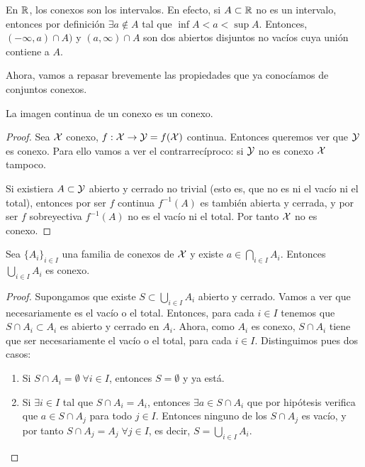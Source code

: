 \begin{exa}
	En $\mathbb{R}$, los conexos son los intervalos. En efecto, si $A\subset\mathbb{R}$ no es un intervalo, entonces por definición $\exists a\notin A$ tal que $\inf A< a < \sup A$. Entonces, $(-\infty, a)\cap A)$ y $(a,\infty)\cap A$ son dos abiertos disjuntos no vacíos cuya unión contiene a $A$.
\end{exa}

Ahora, vamos a repasar brevemente las propiedades que ya conocíamos de conjuntos conexos.

\begin{prop}
	\label{conex_prop_im_continua}
	La imagen continua de un conexo es un conexo.
	
	\begin{proof}
		Sea $\mathcal{X}$ conexo, $f:\mathcal{X}\to\mathcal{Y}=f(\mathcal{X})$ continua. Entonces queremos ver que $\mathcal{Y}$ es conexo. Para ello vamos a ver el contrarrecíproco: si $\mathcal{Y}$ no es conexo $\mathcal{X}$ tampoco.
		
		Si existiera $A\subset\mathcal{Y}$ abierto y cerrado no trivial (esto es, que no es ni el vacío ni el total), entonces por ser $f$ continua $f^{-1}(A)$ es también abierta y cerrada, y por ser $f$ sobreyectiva $f^{-1}(A)$ no es el vacío ni el total. Por tanto $\mathcal{X}$ no es conexo.
	\end{proof}
\end{prop}

\begin{theo}
	\label{conex_theo_pivote}
	Sea $\{A_i\}_{i\in I}$ una familia de conexos de $\mathcal{X}$ y existe $a\in\bigcap_{i\in I} A_i$. Entonces $\bigcup_{i\in I} A_i$ es conexo.
	
	\begin{proof}
		Supongamos que existe $S\subset\bigcup_{i\in I} A_i$ abierto y cerrado. Vamos a ver que necesariamente es el vacío o el total. Entonces, para cada $i\in I$ tenemos que $S\cap A_i\subset A_i$ es abierto y cerrado en $A_i$. Ahora, como $A_i$ es conexo, $S\cap A_i$ tiene que ser necesariamente el vacío o el total, para cada $i\in I$. Distinguimos pues dos casos:
		\begin{enumerate}
			\item Si $S\cap A_i=\emptyset\;\forall i\in I$, entonces $S=\emptyset$ y ya está.
			\item Si $\exists i\in I$ tal que $S\cap A_i=A_i$, entonces $\exists a\in S\cap A_i$ que por hipótesis verifica que $a\in S\cap A_j$ para todo $j\in I$. Entonces ninguno de los $S\cap A_j$ es vacío, y por tanto $S\cap A_j=A_j\;\forall j\in I$, es decir, $S=\bigcup_{i\in I} A_i$. \qedhere
		\end{enumerate}
	\end{proof}
\end{theo}

